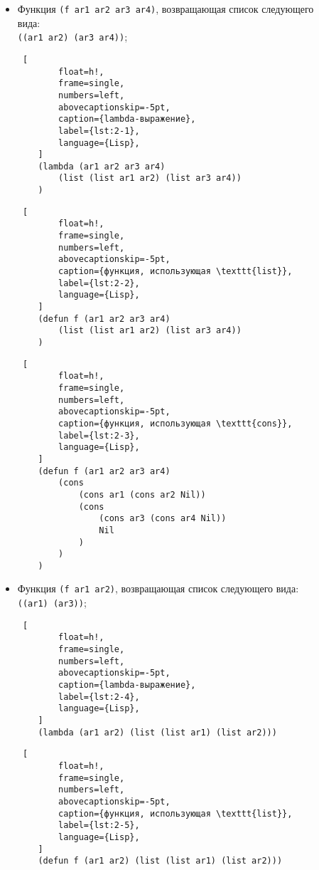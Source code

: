 \begin{itemize}
    \item Функция \texttt{(f ar1 ar2 ar3 ar4)}, возвращающая список следующего\\ вида:\\\texttt{((ar1 ar2) (ar3 ar4))};
    
    \begin{lstlisting} [
		float=h!,
		frame=single,
		numbers=left,
		abovecaptionskip=-5pt,
		caption={lambda-выражение},
		label={lst:2-1},
		language={Lisp},
	]
    (lambda (ar1 ar2 ar3 ar4) 
        (list (list ar1 ar2) (list ar3 ar4))
    )
    \end{lstlisting}
    
    \begin{lstlisting} [
		float=h!,
		frame=single,
		numbers=left,
		abovecaptionskip=-5pt,
		caption={функция, использующая \texttt{list}},
		label={lst:2-2},
		language={Lisp},
	]
    (defun f (ar1 ar2 ar3 ar4) 
        (list (list ar1 ar2) (list ar3 ar4))
    )
    \end{lstlisting}

    \begin{lstlisting} [
		float=h!,
		frame=single,
		numbers=left,
		abovecaptionskip=-5pt,
		caption={функция, использующая \texttt{cons}},
		label={lst:2-3},
		language={Lisp},
	]
    (defun f (ar1 ar2 ar3 ar4) 
        (cons 
            (cons ar1 (cons ar2 Nil)) 
            (cons 
                (cons ar3 (cons ar4 Nil)) 
                Nil
            )
        )
    )
    \end{lstlisting}

    \item Функция \texttt{(f ar1 ar2)}, возвращающая список следующего вида:\\\texttt{((ar1) (ar3))};
    
    \begin{lstlisting} [
		float=h!,
		frame=single,
		numbers=left,
		abovecaptionskip=-5pt,
		caption={lambda-выражение},
		label={lst:2-4},
		language={Lisp},
	]
    (lambda (ar1 ar2) (list (list ar1) (list ar2)))
    \end{lstlisting}
    
    \begin{lstlisting} [
		float=h!,
		frame=single,
		numbers=left,
		abovecaptionskip=-5pt,
		caption={функция, использующая \texttt{list}},
		label={lst:2-5},
		language={Lisp},
	]
    (defun f (ar1 ar2) (list (list ar1) (list ar2)))
    \end{lstlisting}
    

\end{itemize}
